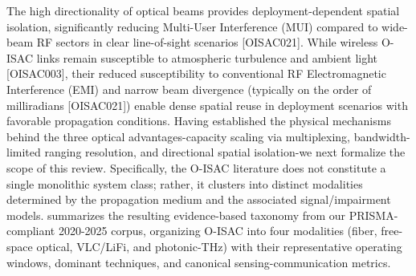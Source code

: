 \markdownRendererUlEndTight \markdownRendererInterblockSeparator
{}
\markdownRendererSectionEnd \markdownRendererSectionBegin
{}\markdownRendererInterblockSeparator
{}The high directionality of optical beams provides deployment-dependent spatial isolation, significantly reducing Multi-User Interference (MUI) compared to wide-beam RF sectors in clear line-of-sight scenarios [O\markdownRendererUnderscore{}ISAC\markdownRendererUnderscore{}021]. While wireless O-ISAC links remain susceptible to atmospheric turbulence and ambient light [O\markdownRendererUnderscore{}ISAC\markdownRendererUnderscore{}003], their reduced susceptibility to conventional RF Electromagnetic Interference (EMI) and narrow beam divergence (typically on the order of milliradians [O\markdownRendererUnderscore{}ISAC\markdownRendererUnderscore{}021]) enable dense spatial reuse in deployment scenarios with favorable propagation conditions.\markdownRendererInterblockSeparator
{}
\markdownRendererSectionEnd 
\markdownRendererSectionEnd \markdownRendererSectionBegin
{}\markdownRendererInterblockSeparator
{}Having established the physical mechanisms behind the three optical advantages-capacity scaling via multiplexing, bandwidth-limited ranging resolution, and directional spatial isolation-we next formalize the scope of this review. Specifically, the O-ISAC literature does not constitute a single monolithic system class; rather, it clusters into distinct modalities determined by the propagation medium and the associated signal/impairment models.  summarizes the resulting evidence-based taxonomy from our PRISMA-compliant 2020-2025 corpus, organizing O-ISAC into four modalities (fiber, free-space optical, VLC/LiFi, and photonic-THz) with their representative operating windows, dominant techniques, and canonical sensing-communication metrics.\markdownRendererParagraphSeparator
{}\markdownRendererInterblockSeparator

